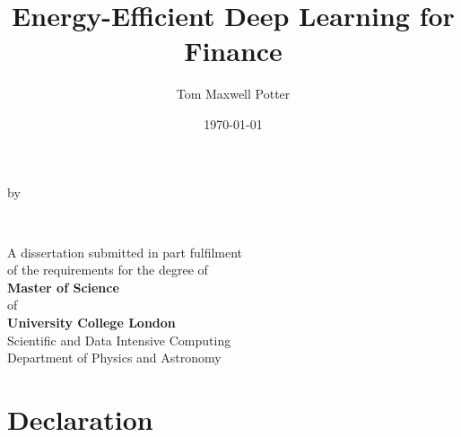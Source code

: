 \documentclass[a4paper, 11pt]{report}
\title{Energy-Efficient Deep Learning for Finance}
\author{Tom Maxwell Potter}
\date{\today}
\begin{document}
    \begin{titlepage}
        \begin{center}
            \vspace*{1cm}
            
            \vfill
            
            \makeatletter
            {\Huge\textbf{\@title}}

            \vspace{0.8cm}
            by
            \vspace{0.8cm}

            {\Large\textbf{\@author}}

            \vspace{1.5cm}
            {\textbf{\\\@date}}

            \vfill

            {A dissertation submitted in part fulfilment\\
            of the requirements for the degree of\\}
            {
            \textbf{Master of Science}\\
            of\\
            \textbf{University College London\\}}
            \vspace{1cm}
            {Scientific and Data Intensive Computing\\
            Department of Physics and Astronomy}

            \vspace{2cm}
        \end{center}
    \end{titlepage}


    \chapter*{Declaration}
    
\end{document}
